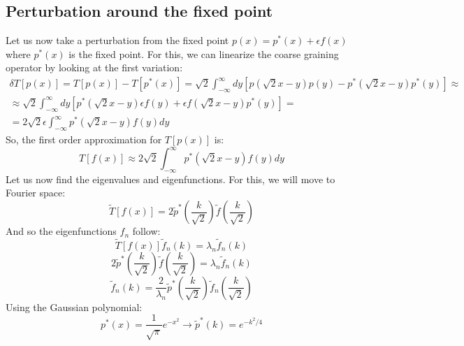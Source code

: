 \documentclass{article}
\begin{document}
\subsection{Perturbation around the fixed point}
Let us now take a perturbation from the fixed point $p(x) = p^*(x) + \epsilon f(x)$ where $p^*(x)$ is the fixed point. For this, we can linearize the coarse graining operator by looking at the first variation:
\begin{equation}
\begin{gathered}
    \delta T\left[p(x)\right] = T\left[p(x)\right] - T\left[p^*(x)\right] = \sqrt{2}\int_{-\infty}^\infty dy \left[
        p(\sqrt{2}x - y)p(y) -  p^*(\sqrt{2}x - y)p^*(y)
    \right] \approx \\ \approx
    \sqrt{2}\int_{-\infty}^\infty dy \left[
        p^*(\sqrt{2}x - y)\epsilon f(y) + \epsilon f(\sqrt{2}x - y)p^*(y)
    \right] = \\ = 2\sqrt{2}\epsilon\int_{-\infty}^\infty p^*(\sqrt{2}x - y) f(y) dy
\end{gathered}
\end{equation}
So, the first order approximation for $T[p(x)]$ is:
\begin{equation}
    T\left[f(x)\right] \approx 2\sqrt{2}\int_{-\infty}^\infty p^*(\sqrt{2}x - y)f(y)dy
\end{equation}
Let us now find the eigenvalues and eigenfunctions. For this, we will move to Fourier space:
\begin{equation}
    \tilde{T}\left[f(x)\right] = 2\tilde{p}^*\left(\frac{k}{\sqrt{2}}\right)\tilde{f}\left(\frac{k}{\sqrt{2}}\right)
\end{equation}
And so the eigenfunctions $f_n$ follow:
\begin{equation}
    \tilde{T}\left[f(x)\right] \tilde{f}_n(k) = \lambda_n \tilde{f}_n(k)
\end{equation}
\begin{equation}
    2\tilde{p}^*\left(\frac{k}{\sqrt{2}}\right)\tilde{f}\left(\frac{k}{\sqrt{2}}\right) = \lambda_n \tilde{f}_n(k)
\end{equation}
\begin{equation}
    \tilde{f}_n(k) = \frac{2}{\lambda_n}\tilde{p}^*\left(\frac{k}{\sqrt{2}}\right)\tilde{f}_n\left(\frac{k}{\sqrt{2}}\right)
\end{equation}
Using the Gaussian polynomial:
\begin{equation}
    p^*(x) = \frac{1}{\sqrt{\pi}}e^{-x^2} \rightarrow \tilde{p}^*(k) = e^{-k^2/4}
\end{equation}
\end{document}

